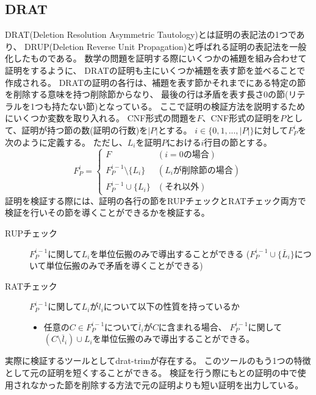 \documentclass[titlepage]{jsarticle}
\begin{document}
\subsection{DRAT}
DRAT(Deletion Resolution Asymmetric Tautology)とは証明の表記法の1つであり、
DRUP(Deletion Reverse Unit Propagation)と呼ばれる証明の表記法を一般化したものである。
数学の問題を証明する際にいくつかの補題を組み合わせて証明をするように、
DRATの証明も主にいくつか補題を表す節を並べることで作成される。
DRATの証明の各行は、補題を表す節かそれまでにある特定の節を削除する意味を持つ削除節からなり、
最後の行は矛盾を表す長さ0の節(リテラルを1つも持たない節)となっている。
ここで証明の検証方法を説明するためにいくつか変数を取り入れる。
CNF形式の問題を$F$、CNF形式の証明を$P$として、証明が持つ節の数(証明の行数)を$|P|$とする。
$i \in \{0,1,...,|P|\}$に対して$F_{P}^{i}$を次のように定義する。
ただし、$L_i$を証明$P$における$i$行目の節とする。
\[
	F_{P}^{i} = 
	\begin{cases}
		F                           & (i=0{の場合}) \\
		F_{P}^{i-1} \setminus \{L_i\} & (L_i{が削除節の場合}) \\
		F_{P}^{i-1} \cup      \{L_i\} & ({それ以外}) 
	\end{cases}
\]
証明を検証する際には、証明の各行の節をRUPチェックとRATチェック両方で検証を行いその節を導くことができるかを検証する。
\begin{description}
	\item[RUPチェック] $F_{P}^{i-1}$に関して$L_i$を単位伝搬のみで導出することができる
		($F_{P}^{i-1} \cup \{\overline L_i\}$について単位伝搬のみで矛盾を導くことができる)
	\item[RATチェック] $F_{P}^{i-1}$に関して$L_i$が$l_i$について以下の性質を持っているか \\
		\begin{itemize}
			\item 任意の$C \in F_{P}^{i-1}$について$\overline l_i$が$C$に含まれる場合、
				$F_{P}^{i-1}$に関して$(C \setminus {\overline l_i}) \cup L_i$を単位伝搬のみで導出することができる。
		\end{itemize}
\end{description}
実際に検証するツールとしてdrat-trimが存在する。
このツールのもう1つの特徴として元の証明を短くすることができる。
検証を行う際にもとの証明の中で使用されなかった節を削除する方法で元の証明よりも短い証明を出力している。
\end{document}

